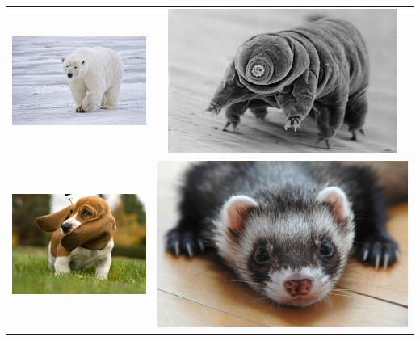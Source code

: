 \documentclass[12pt]{article}
\begin{document}
\begin{tabular}{ c c }
	\includegraphics[scale=0.5]{polar_bear.jpg} & \includegraphics[scale=0.50]{tardigrade.jpeg} \\ \includegraphics[scale=0.5]{dog.jpg} & \includegraphics[scale=0.5]{ferret.jpg}

\end{tabular}
\end{document}
